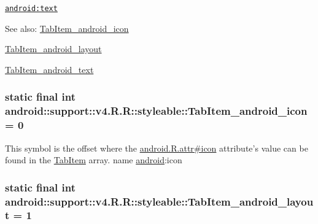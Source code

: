 {\tt \hyperlink{classandroid_1_1support_1_1v4_1_1_r_1_1styleable_babc8d1758b634fdce812a00987ed3f8}{android:text}}

\begin{Desc}
\item[See also:]\hyperlink{classandroid_1_1support_1_1v4_1_1_r_1_1styleable_2bfc174d7f5725cca2d71de0e14005c8}{TabItem\_\-android\_\-icon} 

\hyperlink{classandroid_1_1support_1_1v4_1_1_r_1_1styleable_4b8fe999918d09fb6a54d5db061df9d3}{TabItem\_\-android\_\-layout} 

\hyperlink{classandroid_1_1support_1_1v4_1_1_r_1_1styleable_babc8d1758b634fdce812a00987ed3f8}{TabItem\_\-android\_\-text} \end{Desc}
\hypertarget{classandroid_1_1support_1_1v4_1_1_r_1_1styleable_2bfc174d7f5725cca2d71de0e14005c8}{
\subsubsection[{TabItem\_\-android\_\-icon}]{\setlength{\rightskip}{0pt plus 5cm}static final int android::support::v4.R.R::styleable::TabItem\_\-android\_\-icon = 0}}
\label{classandroid_1_1support_1_1v4_1_1_r_1_1styleable_2bfc174d7f5725cca2d71de0e14005c8}


This symbol is the offset where the \hyperlink{}{android.R.attr\#icon} attribute's value can be found in the \hyperlink{classandroid_1_1support_1_1v4_1_1_r_1_1styleable_91eab1ea34174d58d08c76c2c097a4b4}{TabItem} array.  name \hyperlink{namespaceandroid}{android}:icon \hypertarget{classandroid_1_1support_1_1v4_1_1_r_1_1styleable_4b8fe999918d09fb6a54d5db061df9d3}{
\subsubsection[{TabItem\_\-android\_\-layout}]{\setlength{\rightskip}{0pt plus 5cm}static final int android::support::v4.R.R::styleable::TabItem\_\-android\_\-layout = 1}}
\label{classandroid_1_1support_1_1v4_1_1_r_1_1styleable_4b8fe999918d09fb6a54d5db061df9d3}


